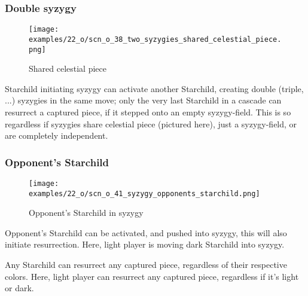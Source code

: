 \clearpage %

\subsubsection*{Double syzygy}
\label{sec:One/Starchild/Syzygy/Double syzygy}

\vspace*{-1.2\baselineskip}
\noindent
\begin{figure}[!h]
\texttt{[image: examples/22\_o/scn\_o\_38\_two\_syzygies\_shared\_celestial\_piece.png]}
\caption{Shared celestial piece}
\label{fig:scn_o_38_two_syzygies_shared_celestial_piece}
\end{figure}

Starchild initiating syzygy can activate another Starchild, creating double
(triple, ...) syzygies in the same move; only the very last Starchild in a
cascade can resurrect a captured piece, if it stepped onto an empty syzygy-field.
This is so regardless if syzygies share celestial piece (pictured here), just a
syzygy-field, or are completely independent.

\clearpage %

\subsubsection*{Opponent's Starchild}
\label{sec:One/Starchild/Syzygy/Opponent's Starchild}

\vspace*{-1.2\baselineskip}
\noindent
\begin{figure}[!h]
\texttt{[image: examples/22\_o/scn\_o\_41\_syzygy\_opponents\_starchild.png]}
\caption{Opponent's Starchild in syzygy}
\label{fig:scn_o_41_syzygy_opponents_starchild}
\end{figure}

Opponent's Starchild can be activated, and pushed into syzygy, this will also
initiate resurrection. Here, light player is moving dark Starchild into syzygy.

Any Starchild can resurrect any captured piece, regardless of their respective
colors. Here, light player can resurrect any captured piece, regardless if it's
light or dark.

